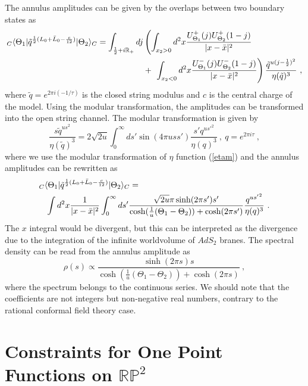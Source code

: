 \documentclass[a4paper,12pt]{article}
\newcommand{\br}{\mathbb R}
\newcommand{\brp}{{\mathbb R \mathbb P}^2}
\newcommand{\ket}[1]{{|#1\rangle}{}}
\newcommand{\bra}[1]{{\langle#1|}}
\newcommand{\tq}{\tilde{q}}
\newcommand{\nn}{\nonumber\\}
\begin{document}
The annulus amplitudes can be given by the overlaps between two boundary
states as
\begin{eqnarray}
 \lefteqn{{}_C \bra{\Theta_1} 
 \tq^{\frac{1}{2}(L_0 + \bar{L}_0 - \frac{c}{12})} 
   \ket{\Theta_2}_C =
\int_{\frac{1}{2}+ i \br_+} dj \left(
 \int_{x_2 > 0} d^2 x 
 \frac{U^+_{\Theta_1}(j) U^+ _{\Theta_2} (1-j)}{|x-\bar{x}|^2} 
   \right.} \nn && \hspace{5.5cm} +~ \left.
 \int_{x_2 < 0} d^2 x 
 \frac{U^-_{\Theta_1}(j) U^-_{\Theta_2} (1-j)}{|x-\bar{x}|^2} 
\right) \frac{\tq^{u(j-\frac{1}{2})^2}}{\eta (\tq)^3} ~,
\label{AA}
\end{eqnarray} 
where $\tq = e^{2 \pi i ( -1/\tau )}$ 
is the closed string modulus and $c$ is the
central charge of the model. Using the modular transformation, the
amplitudes can be transformed into the open string channel. 
The modular transformation is given by
\begin{equation}
 \frac{s \tq^{us^2}}{\eta(\tq)^3 } = 2\sqrt{2u} \int ^{\infty} _0
 d s' \sin (4 \pi u s s')   \frac{s' q^{u{s'}^2}}{\eta(q)^3 } ~,~
 q = e^{2 \pi i \tau} ~,
\label{S-trans}
\end{equation}
where we use the modular transformation of $\eta$ function (\ref{etam}) 
and the annulus amplitudes can be rewritten as
\begin{eqnarray}
 \lefteqn{{}_C \bra{\Theta_1} 
 \tq^{\frac{1}{2}(L_0 + \bar{L}_0 - \frac{c}{12})} 
   \ket{\Theta_2}_C =}\nn
&& \int d^2 x \frac{ 1 }{| x - \bar{x} |^2} 
   \int ^{\infty} _0 d s' \frac{ \sqrt{2 u} \pi  \sinh (2 \pi s') s'}{
   \cosh (\frac{1}{u} (\Theta_1 - \Theta_2)) + \cosh(2 \pi s')}
   \frac{ q^{u{s'}^2}}{\eta (q)^3}~.
\end{eqnarray} 
The $x$ integral would be divergent, but this can be interpreted as the
divergence due to the integration of the infinite worldvolume of $AdS_2$
branes.  
The spectral density can be read from the annulus amplitude as
\begin{equation}
 \rho (s) \propto \frac{  \sinh (2 \pi s) s}{
   \cosh (\frac{1}{u} (\Theta_1 - \Theta_2)) + \cosh(2 \pi s)} ~,
\label{doso}
\end{equation}   
where the  spectrum belongs to the continuous series.
We should note that the coefficients are
not integers but non-negative real numbers, 
contrary to the rational conformal field theory case. 



\section{Constraints for One Point Functions on $\brp$}
\indent
\end{document}
